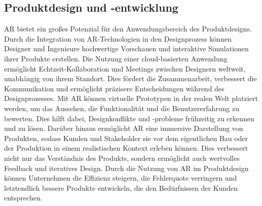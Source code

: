 \subsection{Produktdesign und -entwicklung}
AR bietet ein großes Potenzial für den Anwendungsbereich
des Produktdesigns. Durch die Integration von AR-Technologien in den
Designprozess können Designer und Ingenieure hochwertige Vorschauen und
interaktive Simulationen ihrer Produkte erstellen. Die Nutzung einer
cloud-basierten Anwendung ermöglicht Echtzeit-Kollaboration und Meetings
zwischen Designern weltweit, unabhängig von ihrem Standort. Dies fördert die
Zusammenarbeit, verbessert die Kommunikation und ermöglicht präzisere
Entscheidungen während des Designprozesses. Mit AR können virtuelle Prototypen
in der realen Welt platziert werden, um das Aussehen, die Funktionalität und
die Benutzererfahrung zu bewerten. Dies hilft dabei, Designkonflikte und
-probleme frühzeitig zu erkennen und zu lösen. Darüber hinaus ermöglicht AR
eine immersive Darstellung von Produkten, sodass Kunden und Stakeholder sie vor
dem eigentlichen Bau oder der Produktion in einem realistischen Kontext erleben
können. Dies verbessert nicht nur das Verständnis des Produkts, sondern
ermöglicht auch wertvolles Feedback und iteratives Design. Durch die Nutzung
von AR im Produktdesign können Unternehmen die Effizienz steigern, die
Fehlerquote verringern und letztendlich bessere Produkte entwickeln, die den
Bedürfnissen der Kunden entsprechen.\cite{mourtzis2020augmented}

